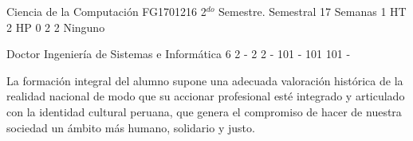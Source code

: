 \documentclass[a4paper,8pt]{article}
\begin{document}
\setNombreProfesor{}
\setGradoProfesorAbreviado{}
\sylabusHeader

\academicaTable
{Ciencia de la Computación} %
{FG1701216} %
{2$^{do}$ Semestre.} %
{Semestral} %
{17 Semanas} %
{1 HT} %
{2 HP} %
{0} %
{}  %
{2} %
{2} %
{Ninguno} %

\administrativaTable
{Doctor} %
{Ingeniería de Sistemas e Informática} %
{6} %
{2} %
{-} %
{2} %
{2} %
{-} %
{101} %
{-} %
{101} %
{101} %
{-} %


\begin{fundamentacion}
La formación integral del alumno supone una adecuada valoración histórica de la realidad nacional de modo que su accionar profesional esté integrado y articulado con la identidad cultural peruana, que genera el compromiso de hacer de nuestra sociedad un ámbito más humano, solidario y justo.

\end{fundamentacion}

\begin{sumilla}
\item 
\item 
\item 
\item 

\end{sumilla}

\begin{competenciasAsignatura}
\item {}

\end{competenciasAsignatura}
\end{document}
